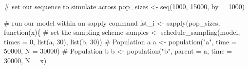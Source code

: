 \documentclass[
  letterpaper,
  DIV=11,
  numbers=noendperiod]{scrartcl}
\newenvironment{Shaded}{\begin{snugshade}}{\end{snugshade}}
\newcommand{\AttributeTok}[1]{\textcolor[rgb]{0.40,0.45,0.13}{#1}}
\newcommand{\CommentTok}[1]{\textcolor[rgb]{0.37,0.37,0.37}{#1}}
\newcommand{\ControlFlowTok}[1]{\textcolor[rgb]{0.00,0.23,0.31}{#1}}
\newcommand{\DecValTok}[1]{\textcolor[rgb]{0.68,0.00,0.00}{#1}}
\newcommand{\FunctionTok}[1]{\textcolor[rgb]{0.28,0.35,0.67}{#1}}
\newcommand{\NormalTok}[1]{\textcolor[rgb]{0.00,0.23,0.31}{#1}}
\newcommand{\OtherTok}[1]{\textcolor[rgb]{0.00,0.23,0.31}{#1}}
\newcommand{\StringTok}[1]{\textcolor[rgb]{0.13,0.47,0.30}{#1}}
\begin{document}
\begin{Shaded}
\begin{Highlighting}[]
\CommentTok{\# set our sequence to simulate across}
\NormalTok{pop\_sizes }\OtherTok{\textless{}{-}} \FunctionTok{seq}\NormalTok{(}\DecValTok{1000}\NormalTok{, }\DecValTok{15000}\NormalTok{, }\AttributeTok{by =} \DecValTok{1000}\NormalTok{)}

\CommentTok{\# run our model within an sapply command}
\NormalTok{fst\_i }\OtherTok{\textless{}{-}} \FunctionTok{sapply}\NormalTok{(pop\_sizes, }\ControlFlowTok{function}\NormalTok{(x)\{}
  \CommentTok{\# set the sampling scheme}
\NormalTok{  samples }\OtherTok{\textless{}{-}} \FunctionTok{schedule\_sampling}\NormalTok{(model, }\AttributeTok{times =} \DecValTok{0}\NormalTok{, }\FunctionTok{list}\NormalTok{(a, }\DecValTok{30}\NormalTok{), }\FunctionTok{list}\NormalTok{(b, }\DecValTok{30}\NormalTok{))}
  \CommentTok{\# Population a}
\NormalTok{  a }\OtherTok{\textless{}{-}} \FunctionTok{population}\NormalTok{(}\StringTok{"a"}\NormalTok{, }\AttributeTok{time =} \DecValTok{50000}\NormalTok{, }\AttributeTok{N =} \DecValTok{30000}\NormalTok{)}
  \CommentTok{\# Population b }
\NormalTok{  b }\OtherTok{\textless{}{-}} \FunctionTok{population}\NormalTok{(}\StringTok{"b"}\NormalTok{, }\AttributeTok{parent =}\NormalTok{ a, }\AttributeTok{time =} \DecValTok{30000}\NormalTok{, }\AttributeTok{N =}\NormalTok{ x)}
  

\end{Highlighting}
\end{Shaded}
\end{document}
